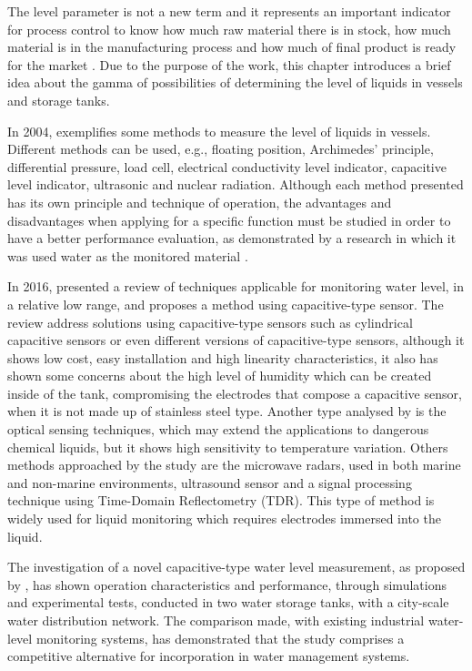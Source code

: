 The level parameter is not a new term and it represents an important indicator for process control to know how much raw material there is in stock, how much material is in the manufacturing process and how much of final product is ready for the market \cite{SA:2001}. Due to the purpose of the work, this chapter introduces a brief idea about the gamma of possibilities of determining the level of liquids in vessels and storage tanks.

In 2004, \cite{BOLTON:2004} exemplifies some methods to measure the level of liquids in vessels. Different methods can be used, e.g., floating position, Archimedes' principle, differential pressure, load cell, electrical conductivity level indicator, capacitive level indicator, ultrasonic and nuclear radiation. Although each method presented has its own principle and technique of operation, the advantages and disadvantages when applying for a specific function must be studied in order to have a better performance evaluation, as demonstrated by a research in which it was used water as the monitored material \cite{LOIZOU:2016}. 

In 2016, \cite{LOIZOU:2016} presented a review of techniques applicable for monitoring water level, in a relative low range, and proposes a method using capacitive-type sensor. The review address solutions using capacitive-type sensors such as cylindrical capacitive sensors or even different versions of capacitive-type sensors, although it shows low cost, easy installation and high linearity characteristics, it also has shown some concerns about the high level of humidity which can be created inside of the tank, compromising the electrodes that compose a capacitive sensor, when it is not made up of stainless steel type. Another type analysed by \cite{LOIZOU:2016} is the optical sensing techniques, which may extend the applications to dangerous chemical liquids, but it shows high sensitivity to temperature variation. Others methods approached by the study are the microwave radars, used in both marine and non-marine environments, ultrasound sensor and a signal processing technique using Time-Domain Reflectometry (TDR). This type of method is widely used for liquid monitoring which requires electrodes immersed into the liquid. 

The investigation of a novel capacitive-type water level measurement, as proposed by \cite{LOIZOU:2015}, has shown operation characteristics and performance, through simulations and experimental tests, conducted in two water storage tanks, with a city-scale water distribution network. The comparison made, with existing industrial water-level monitoring systems, has demonstrated that the study comprises a competitive alternative for incorporation in water management systems.

